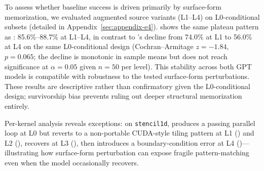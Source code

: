 To assess whether baseline success is driven primarily by surface-form memorization, we evaluated augmented source variants (L1--L4) on L0-conditional subsets (detailed in Appendix~\ref{sec:appendix-e4}). \codex{} shows the same plateau pattern as \gptnew{}: 85.6\%--88.7\% at L1--L4, in contrast to \qwenshort{}'s decline from 74.0\% at L1 to 56.0\% at L4 on the same L0-conditional design (Cochran--Armitage $z = -1.84$, $p = 0.065$; the decline is monotonic in sample means but does not reach significance at $\alpha = 0.05$ given $n = 50$ per level). This stability across both GPT models is compatible with robustness to the tested surface-form perturbations. These results are descriptive rather than confirmatory given the L0-conditional design; survivorship bias prevents ruling out deeper structural memorization entirely.


Per-kernel analysis reveals exceptions: on \texttt{stencil1d}, \qwenshort{} produces a passing parallel loop at L0 but reverts to a non-portable CUDA-style tiling pattern at L1 (\buildfail{}) and L2 (\verifyfail{}), recovers at L3 (\pass{}), then introduces a boundary-condition error at L4 (\verifyfail{})---illustrating how surface-form perturbation can expose fragile pattern-matching even when the model occasionally recovers.
